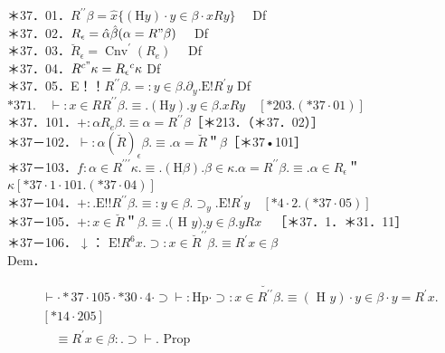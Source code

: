 \documentclass[10pt]{article}
\begin{document}
＊37．01．$R^{\prime \prime} \beta=\widehat{x}\{(\mathrm{H} y) \cdot y \in \beta \cdot x R y\} \quad$ Df\\
＊37．02．$R_{\epsilon}=\hat{\alpha} \hat{\beta}(\alpha=R " \beta) \quad$ Df\\
＊37．03．$\breve{R}_{\epsilon}=\operatorname{Cnv}^{\prime}\left(R_{e}\right) \quad$ Df\\
＊37．04．$R^{c "} \kappa=R_{\epsilon}{ }^{c} \kappa$ Df\\
＊37．05．E！！$R^{\prime \prime} \beta .=: y \in \beta . \partial_{y} . \mathrm{E}!R^{\prime} y$ Df\\
$* 371 . \quad \vdash: x \in R R^{\prime \prime} \beta . \equiv .(\mathrm{H} y) . y \in \beta . x R y \quad[* 203 .(* 37 \cdot 01)]$\\
＊37．101．$+: \alpha R_{e} \beta . \equiv \alpha=R^{\prime \prime} \beta$［＊213．（＊37．02）］\\
＊37－102．$\vdash: \alpha(\breve{R})_{\epsilon} \beta . \equiv . \alpha=\breve{R}$＂$\beta$［＊37•101］\\
＊37－103．$f: \alpha \in R^{\prime \prime \prime} \kappa . \equiv .(\mathrm{H} \beta) . \beta \in \kappa . \alpha=R^{\prime \prime} \beta . \equiv . \alpha \in R_{\epsilon}$＂$\kappa [* 37 \cdot 1 \cdot 101 .(* 37 \cdot 04)]$\\
＊37－104．$+: . \mathrm{E}!!R^{\prime \prime} \beta . \equiv: y \in \beta . \supset_{y} . \mathrm{E}!R^{\prime} y \quad[* 4 \cdot 2 .(* 37 \cdot 05)]$\\
＊37－105．$+: x \in \breve{R}$＂$\beta . \equiv .($ H $y) . y \in \beta . y R x \quad$［＊37．1．＊31．11］\\
＊37－106． ↓ ： $\mathrm{E}!R^{6} x . \supset: x \in \breve{R}^{\prime \prime} \beta . \equiv R^{\prime} x \in \beta$\\
Dem．

$$
\begin{aligned}
& \vdash \cdot * 37 \cdot 105 \cdot * 30 \cdot 4 \cdot \supset \vdash: \mathrm{Hp} \cdot \supset: x \in \breve{R^{\prime \prime}} \beta . \equiv(\text { H } y) \cdot y \in \beta \cdot y=R^{\prime} x . \\
& {[* 14 \cdot 205]} \\
& \quad \equiv R^{\prime} x \in \beta: . \supset \vdash . \text { Prop }
\end{aligned}
$$
\end{document}
